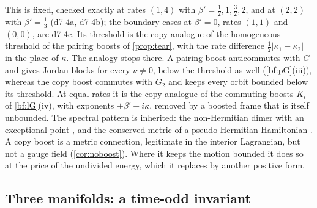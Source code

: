 This is fixed, checked exactly at rates $(1,4)$ with $\beta'=\tfrac12,1,\tfrac32,2$, and at $(2,2)$ with $\beta'=\tfrac13$ (d7-4a, d7-4b); the boundary cases at $\beta'=0$, rates $(1,1)$ and $(0,0)$, are d7-4c. Its threshold is the
copy analogue of the homogeneous threshold of the pairing boosts of \cref{prop:tear}, with the rate difference
$\tfrac12|\kappa_1-\kappa_2|$ in the place of $\kappa$. The analogy stops there. A pairing boost anticommutes with $G$ and gives Jordan blocks for
every $\nu\neq0$, below the threshold as well (\cref{bf:pG}(iii)), whereas the copy boost commutes with $G_2$ and keeps every orbit bounded
below its threshold. At equal rates it is the copy analogue of the commuting boosts $K_i$ of \cref{bf:lG}(iv), with exponents
$\pm\beta'\pm i\kappa$, removed by a boosted frame that is itself unbounded. The spectral pattern is inherited: the
non-Hermitian dimer with an exceptional point \cite{Kato66,BenderBoettcher98}, and the conserved metric of a pseudo-Hermitian Hamiltonian
\cite{Mostafazadeh02}. A copy boost is a metric connection, legitimate in the interior Lagrangian, but not a gauge field (\cref{cor:noboost}). Where it keeps the motion bounded it does so at the price of the undivided energy, which it replaces by another positive form.

\subsection{Three manifolds: a time-odd invariant}
\label{d7:sec:three}

